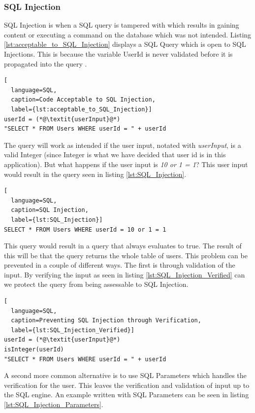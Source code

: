 \subsubsection{SQL Injection}
SQL Injection is when a SQL query is tampered with which results in gaining content or executing a command on the database which was not intended. Listing \ref{lst:acceptable_to_SQL_Injection} displays a SQL Query which is open to SQL Injections. This is because the variable UserId is never validated before it is propagated into the query \parencite{JustinClarke-Salt2009SIAa, Secure_Web}.

\hfill
\begin{lstlisting}[
  language=SQL,
  caption=Code Acceptable to SQL Injection,
  label={lst:acceptable_to_SQL_Injection}]
userId = (*@\textit{userInput}@*)
"SELECT * FROM Users WHERE userId = " + userId
\end{lstlisting}
\hfill

The query will work as intended if the user input, notated with \textit{userInput}, is a valid Integer (since Integer is what we have decided that user id is in this application). But what happens if the user input is \textit{10 or 1 = 1}? This user input would result in the query seen in listing \ref{lst:SQL_Injection}.

\hfill
\begin{lstlisting}[
  language=SQL,
  caption=SQL Injection,
  label={lst:SQL_Injection}]
SELECT * FROM Users WHERE userId = 10 or 1 = 1
\end{lstlisting}
\hfill

This query would result in a query that always evaluates to true. The result of this will be that the query returns the whole table of users. This problem can be prevented in a couple of different ways. The first is through validation of the input. By verifying the input as seen in listing \ref{lst:SQL_Injection_Verified} can we protect the query from being assessable to SQL Injection.

\hfill
\begin{lstlisting}[
  language=SQL,
  caption=Preventing SQL Injection through Verification,
  label={lst:SQL_Injection_Verified}]
userId = (*@\textit{userInput}@*)
isInteger(userId)
"SELECT * FROM Users WHERE userId = " + userId
\end{lstlisting}
\hfill

A second more common alternative is to use SQL Parameters which handles the verification for the user. This leaves the verification and validation of input up to the SQL engine. An example written with SQL Parameters can be seen in listing \ref{lst:SQL_Injection_Parameters}.

